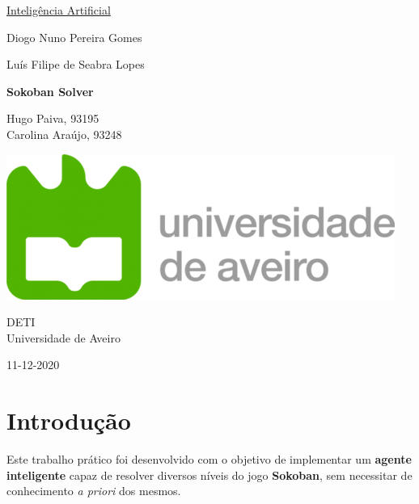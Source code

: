 \documentclass[10pt,portuguese]{article}
\begin{document}
\begin{titlepage}
	\clearpage\thispagestyle{empty}
	\centering
	\vspace{2cm}

	
	{\Large\underline{Inteligência Artificial} \par}
	\vspace{0.5cm}
	{\small
	Diogo Nuno Pereira Gomes \par Luís Filipe de Seabra Lopes  \par}
	\vspace{4cm}
	{\LARGE \textbf{Sokoban Solver}} \\
		\vspace{0.5cm}
	\vspace{1cm}
	\vspace{4cm}
	{\normalsize Hugo Paiva, 93195
	        \\Carolina Araújo, 93248
	   \par}
	\vspace{2cm}

    \includegraphics[scale=0.20]{logo_ua.png}
    
    \vspace{2cm}
    
	{\normalsize DETI \\ 
		Universidade de Aveiro \par}
		
	{\normalsize 11-12-2020 \par}
	\vspace{2cm}
		
	
	\pagebreak

\end{titlepage}
\newpage

\section{Introdução}

\par Este trabalho prático foi desenvolvido com o objetivo de implementar um \textbf{agente inteligente} capaz de resolver diversos níveis do jogo \textbf{Sokoban}, sem necessitar de conhecimento \textit{a priori} dos mesmos. 
\end{document}
